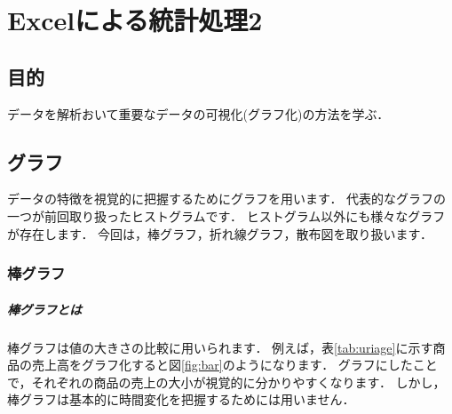 
\chapter{Excelによる統計処理2}
\setcounter{num_prac}{0}

\section{目的}

データを解析おいて重要なデータの可視化(グラフ化)の方法を学ぶ．

\section{グラフ}

データの特徴を視覚的に把握するためにグラフを用います．
代表的なグラフの一つが前回取り扱ったヒストグラムです．
ヒストグラム以外にも様々なグラフが存在します．
今回は，棒グラフ，折れ線グラフ，散布図を取り扱います．

\subsection{棒グラフ}

\paragraph{棒グラフとは}

棒グラフは値の大きさの比較に用いられます．
例えば，表\ref{tab:uriage}に示す商品の売上高をグラフ化すると図\ref{fig:bar}のようになります．
グラフにしたことで，それぞれの商品の売上の大小が視覚的に分かりやすくなります．
しかし，棒グラフは基本的に時間変化を把握するためには用いません．


